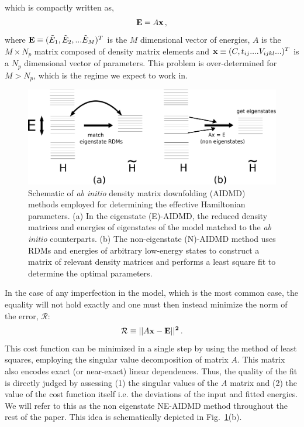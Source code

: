 \documentclass[aps, prb]{revtex4-1}
\begin{document}
which is compactly written as,
\begin{equation}
	{\bf{E}} = A {\bf{x}}
\label{eq:E_Ax}\,,
\end{equation}
where $ {\bf{E}} \equiv (\tilde{E}_1,\tilde{E}_2,...\tilde{E}_M)^{T}$ 
is the $M$ dimensional vector of energies, $A$ is the $M \times N_p$ matrix composed 
of density matrix elements and $ {\bf{x}} \equiv (C,t_{ij}....V_{ijkl}...)^T$ 
is a $N_p$ dimensional vector of parameters.
This problem is over-determined for $M>N_p$, which is the regime we expect to work in.

\begin{figure}[htpb]
\centering
\includegraphics[width=0.6\linewidth]{./aidmd_scheme.pdf}
\caption{Schematic of {\it ab initio} density matrix downfolding (AIDMD) 
methods employed for determining the effective Hamiltonian parameters. 
(a) In the eigenstate (E)-AIDMD, the reduced density matrices and energies 
of eigenstates of the model  matched to the {\it ab initio} 
counterparts. (b) The non-eigenstate (N)-AIDMD method uses 
RDMs and energies of arbitrary low-energy states to construct a matrix of relevant 
density matrices and performs a least square fit to determine the optimal parameters. }
\label{fig:hamfit} 
\end{figure}	

In the case of any imperfection in the model, which is the most common case, 
the equality will not hold exactly 
and one must then instead minimize the norm of the error, $\mathcal{R}$:
\begin{equation}
	\mathcal{R} \equiv ||A\bf{x}-\bf{E}||^2\,.
\label{eq:norm}
\end{equation}
This cost function can be minimized in a single step by using 
the method of least squares, employing the singular 
value decomposition of matrix $A$. This matrix also encodes exact (or near-exact) linear dependences. 
Thus, the quality of the fit is directly judged 
by assessing (1) the singular values of the $A$ matrix and (2) 
the value of the cost function itself i.e. the deviations of the input and fitted energies.
We will refer to this as the non eigenstate NE-AIDMD method throughout the rest of the paper.
This idea is schematically depicted in Fig.~\ref{fig:hamfit}(b).
\end{document}
